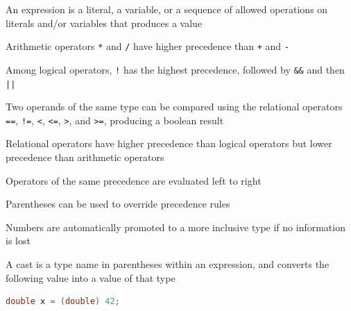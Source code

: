 \documentclass[8pt,a4paper,compress]{beamer}
\begin{document}
\begin{frame}[fragile]
\pause

An expression is a literal, a variable, or a sequence of allowed operations on literals and/or variables that produces a value

\pause
\bigskip

Arithmetic operators \lstinline{*} and \lstinline{/} have higher precedence than \lstinline{+} and \lstinline{-}

\pause
\bigskip

Among logical operators, \lstinline{!} has the highest precedence, followed by \lstinline{&&} and then \lstinline{||}

\pause
\bigskip

Two operands of the same type can be compared using the relational operators \lstinline{==}, \lstinline{!=}, \lstinline{<}, \lstinline{<=}, \lstinline{>}, and \lstinline{>=}, producing a boolean result

\pause
\bigskip

Relational operators have higher precedence than logical operators but lower precedence than arithmetic operators

\pause
\bigskip

Operators of the same precedence are evaluated left to right

\pause
\bigskip

Parentheses can be used to override precedence rules

\pause
\bigskip

Numbers are automatically promoted to a more inclusive type if no information is lost

\pause
\bigskip

A cast is a type name in parentheses within an expression, and converts the following value into a value of that type
\begin{lstlisting}[language=Java]
double x = (double) 42;
\end{lstlisting}
\end{frame}
\end{document}
